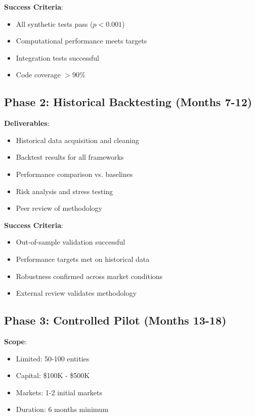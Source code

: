 \documentclass[12pt]{article}
\begin{document}
\textbf{Success Criteria}:
\begin{itemize}
    \item All synthetic tests pass ($p < 0.001$)
    \item Computational performance meets targets
    \item Integration tests successful
    \item Code coverage $> 90\%$
\end{itemize}

\subsection{Phase 2: Historical Backtesting (Months 7-12)}

\textbf{Deliverables}:
\begin{itemize}
    \item Historical data acquisition and cleaning
    \item Backtest results for all frameworks
    \item Performance comparison vs. baselines
    \item Risk analysis and stress testing
    \item Peer review of methodology
\end{itemize}

\textbf{Success Criteria}:
\begin{itemize}
    \item Out-of-sample validation successful
    \item Performance targets met on historical data
    \item Robustness confirmed across market conditions
    \item External review validates methodology
\end{itemize}

\subsection{Phase 3: Controlled Pilot (Months 13-18)}

\textbf{Scope}:
\begin{itemize}
    \item Limited: 50-100 entities
    \item Capital: \$100K - \$500K
    \item Markets: 1-2 initial markets
    \item Duration: 6 months minimum
\end{itemize}
\end{document}
